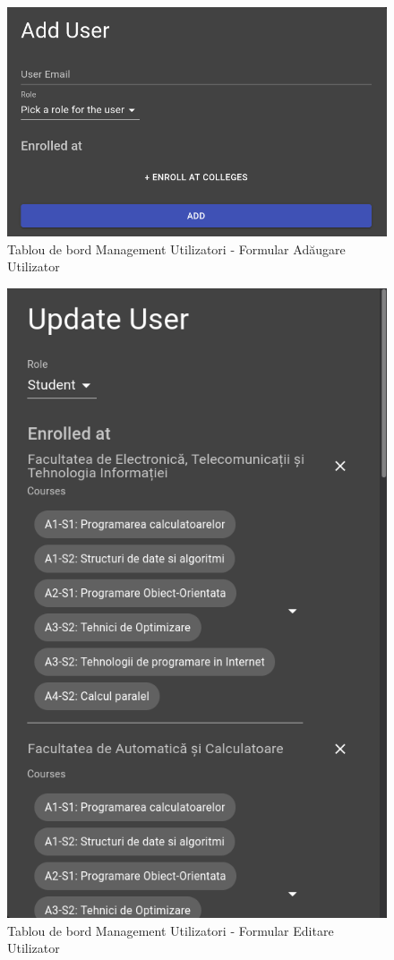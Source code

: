 \documentclass[12pt, a4paper, oneside, romanian]{teza-upb}
\begin{document}
\begin{figure}[H]
\centering
\includegraphics*[width=0.7\columnwidth]{tablou-de-bord-management-utilizatori-formular-adaugare-utilizator}
\caption{Tablou de bord Management Utilizatori - Formular Adăugare Utilizator}
\label{tablou-de-bord-management-utilizatori-formular-adaugare-utilizator}
\end{figure}

\begin{figure}[H]
\centering
\includegraphics*[width=0.65\columnwidth]{tablou-de-bord-management-utilizatori-formular-editare-utilizator}
\caption{Tablou de bord Management Utilizatori - Formular Editare Utilizator}
\label{tablou-de-bord-management-utilizatori-formular-editare-utilizator}
\end{figure}
\end{document}
